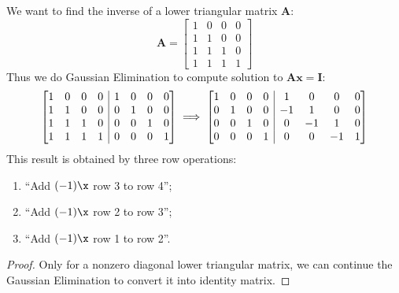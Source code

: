 \begin{enumerate}
\begin{example}
We want to find the inverse of a lower triangular matrix $\bm A$:
\[
\bm A = \begin{bmatrix}
1&0&0&0\\
1&1&0&0\\
1&1&1&0\\
1&1&1&1
\end{bmatrix}
\]
Thus we do Gaussian Elimination to compute solution to $\bm{Ax} = \bm I$:
\[\left[
\begin{array}{@{}cccc|cccc@{}}
1&0&0&0&1&0&0&0\\
1&1&0&0&0&1&0&0\\
1&1&1&0&0&0&1&0\\
1&1&1&1&0&0&0&1
\end{array}\right]
\implies 
\left[
\begin{array}{@{}cccc|cccc@{}}
1&0&0&0&1&0&0&0\\
0&1&0&0&-1&1&0&0\\
0&0&1&0&0&-1&1&0\\
0&0&0&1&0&0&-1&1
\end{array}\right]
\]
This result is obtained by three row operations:
\begin{enumerate}
\item
``Add $(-1)\x$ row 3 to row 4'';
\item
``Add $(-1)\x$ row 2 to row 3'';
\item
``Add $(-1)\x$ row 1 to row 2''.
\end{enumerate}
\end{example}
\begin{proof}
Only for a nonzero diagonal lower triangular matrix, we can continue the Gaussian Elimination to convert it into identity matrix.
\end{proof}


\end{enumerate}
